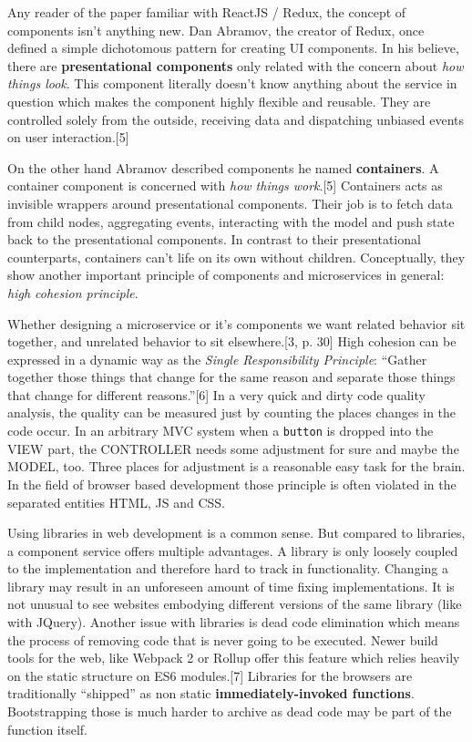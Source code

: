 \documentclass[]{article}
\begin{document}
Any reader of the paper familiar with ReactJS / Redux, the concept of
components isn't anything new. Dan Abramov, the creator of Redux, once
defined a simple dichotomous pattern for creating UI components. In his
believe, there are \textbf{presentational components} only related with
the concern about \emph{how things look}. This component literally
doesn't know anything about the service in question which makes the
component highly flexible and reusable. They are controlled solely from
the outside, receiving data and dispatching unbiased events on user
interaction.{[}5{]}

On the other hand Abramov described components he named
\textbf{containers}. A container component is concerned with \emph{how
things work}.{[}5{]} Containers acts as invisible wrappers around
presentational components. Their job is to fetch data from child nodes,
aggregating events, interacting with the model and push state back to
the presentational components. In contrast to their presentational
counterparts, containers can't life on its own without children.
Conceptually, they show another important principle of components and
microservices in general: \emph{high cohesion principle}.

Whether designing a microservice or it's components we want related
behavior sit together, and unrelated behavior to sit elsewhere.{[}3, p.
30{]} High cohesion can be expressed in a dynamic way as the
\emph{Single Responsibility Principle}: ``Gather together those things
that change for the same reason and separate those things that change
for different reasons.''{[}6{]} In a very quick and dirty code quality
analysis, the quality can be measured just by counting the places
changes in the code occur. In an arbitrary MVC system when a
\texttt{button} is dropped into the VIEW part, the CONTROLLER needs some
adjustment for sure and maybe the MODEL, too. Three places for
adjustment is a reasonable easy task for the brain. In the field of
browser based development those principle is often violated in the
separated entities HTML, JS and CSS.

Using libraries in web development is a common sense. But compared to
libraries, a component service offers multiple advantages. A library is
only loosely coupled to the implementation and therefore hard to track
in functionality. Changing a library may result in an unforeseen amount
of time fixing implementations. It is not unusual to see websites
embodying different versions of the same library (like with JQuery).
Another issue with libraries is dead code elimination which means the
process of removing code that is never going to be executed. Newer build
tools for the web, like Webpack 2 or Rollup offer this feature which
relies heavily on the static structure on ES6 modules.{[}7{]} Libraries
for the browsers are traditionally ``shipped'' as non static
\textbf{immediately-invoked functions}. Bootstrapping those is much
harder to archive as dead code may be part of the function itself.
\end{document}
